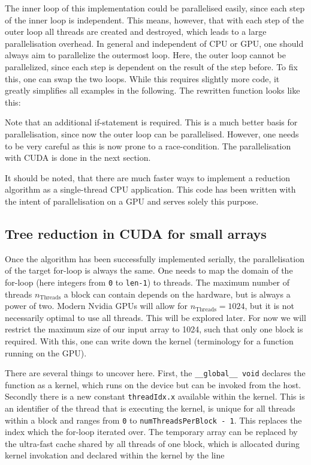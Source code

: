 

The inner loop of this implementation could be parallelised easily, since each step of the inner loop is independent.
This means, however, that with each step of the outer loop all threads are created and destroyed, which leads to a large parallelisation overhead.
In general and independent of CPU or GPU, one should always aim to parallelize the outermost loop.
Here, the outer loop cannot be parallelized, since each step is dependent on the result of the step before.
To fix this, one can swap the two loops.
While this requires slightly more code, it greatly simplifies all examples in the following.
The rewritten function looks like this:



Note that an additional if-statement is required.
This is a much better basis for parallelisation, since now the outer loop can be parallelised.
However, one needs to be very careful as this is now prone to a race-condition.
The parallelisation with CUDA is done in the next section.

It should be noted, that there are much faster ways to implement a reduction algorithm as a single-thread CPU application.
This code has been written with the intent of parallelisation on a GPU and serves solely this purpose.

\subsection{Tree reduction in CUDA for small arrays}
Once the algorithm has been successfully implemented serially, the parallelisation of the target for-loop is always the same.
One needs to map the domain of the for-loop (here integers from \texttt{0} to \texttt{len-1}) to threads.
The maximum number of threads \( n_{\mathrm{Threads}} \) a block can contain depends on the hardware, but is always a power of two.
Modern Nvidia GPUs will allow for \( n_{\mathrm{Threads}} = 1024 \), but it is not necessarily optimal to use all threads.
This will be explored later.
For now we will restrict the maximum size of our input array to 1024, such that only one block is required.
With this, one can write down the kernel (terminology for a function running on the GPU).



There are several things to uncover here. First, the \texttt{\_\_global\_\_ void} declares the function as a kernel, which runs on the device but can be invoked from the host. 
Secondly there is a new constant \texttt{threadIdx.x} available within the kernel.
This is an identifier of the thread that is executing the kernel, is unique for all threads within a block and ranges from \texttt{0} to \texttt{numThreadsPerBlock - 1}.
This replaces the index which the for-loop iterated over.
The temporary array can be replaced by the ultra-fast cache shared by all threads of one block, which is allocated during kernel invokation and declared within the kernel by the line

